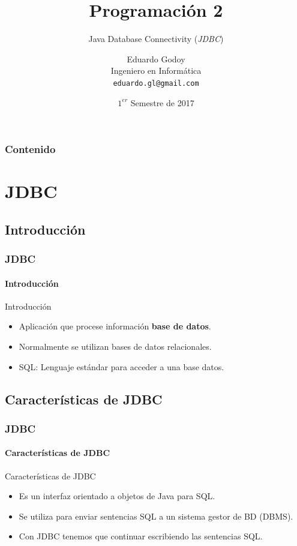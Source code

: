 \documentclass{beamer}
\title[\textbf{Programaci\'on 2}]{\textbf{Programaci\'on 2}}
\subtitle{Java Database Connectivity (\emph{JDBC})}
\author[Rodrigo Olivares]
{
	Eduardo Godoy \\
	\vspace{0.5mm}
	Ingeniero en Inform\'atica \\
	\vspace{0.5mm}
	\texttt{\normalsize eduardo.gl@gmail.com}
}
\institute[Universidad de Valpara\'iso]
\date{$1^{er}$ Semestre de 2017}
\begin{document}
	\begin{frame}
		\titlepage
	\end{frame}

	\begin{frame}
		\frametitle{Contenido}
		\tableofcontents[pausesections]
	\end{frame}

    \section{JDBC}

    \subsection{Introducci\'on}

	\begin{frame}
		\frametitle{JDBC}
		\framesubtitle{Introducci\'on}

		\begin{block}{Introducci\'on}
		    \begin{itemize}
		        \item Aplicaci\'on que procese informaci\'on \textbf{base de datos}.
		        \item Normalmente se utilizan bases de datos relacionales.
		        \item SQL: Lenguaje est\'andar para acceder a una base datos.
		    \end{itemize}
		\end{block}
	\end{frame}

    \subsection{Caracter\'isticas de JDBC}

	\begin{frame}
		\frametitle{JDBC}
		\framesubtitle{Caracter\'isticas de JDBC}

		\begin{block}{Caracter\'isticas de JDBC }
		    \begin{itemize}
		        \item Es un interfaz orientado a objetos de Java para SQL.
		        \item Se utiliza para enviar sentencias SQL a un sistema gestor de BD (DBMS).
		        \item Con JDBC tenemos que continuar escribiendo las sentencias SQL.
		    \end{itemize}
		\end{block}
	\end{frame}
\end{document}
